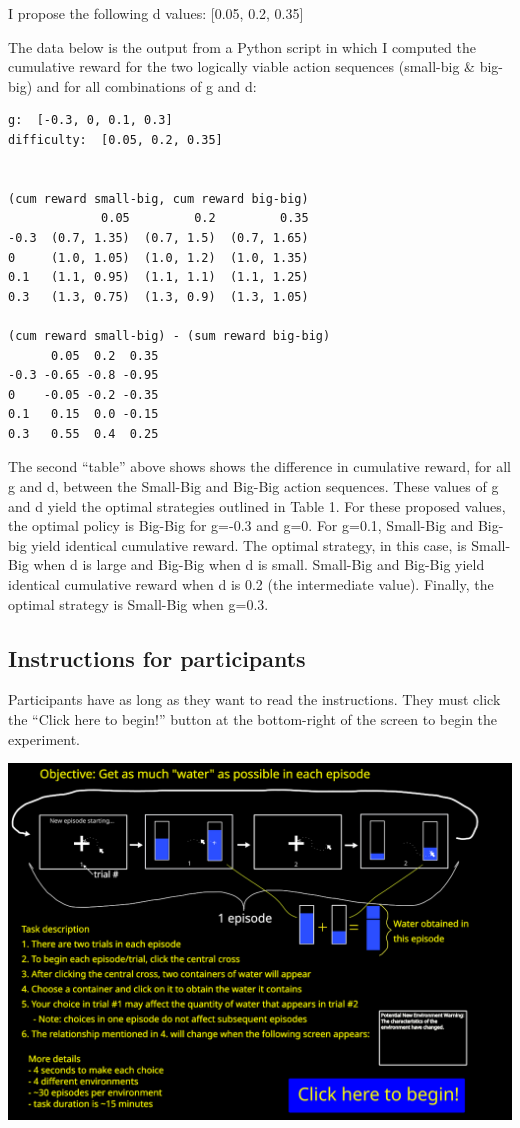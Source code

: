 \documentclass[11pt]{article}
\begin{document}
I propose the following d values: [0.05, 0.2, 0.35]

The data below is the output from a Python script in which I computed the cumulative reward for the two logically viable action sequences (small-big \& big-big) and for all combinations of g and d:

\label{}
\begin{verbatim}
g:  [-0.3, 0, 0.1, 0.3]
difficulty:  [0.05, 0.2, 0.35]


(cum reward small-big, cum reward big-big)
             0.05         0.2         0.35
-0.3  (0.7, 1.35)  (0.7, 1.5)  (0.7, 1.65)
0     (1.0, 1.05)  (1.0, 1.2)  (1.0, 1.35)
0.1   (1.1, 0.95)  (1.1, 1.1)  (1.1, 1.25)
0.3   (1.3, 0.75)  (1.3, 0.9)  (1.3, 1.05) 

(cum reward small-big) - (sum reward big-big)
      0.05  0.2  0.35
-0.3 -0.65 -0.8 -0.95
0    -0.05 -0.2 -0.35
0.1   0.15  0.0 -0.15
0.3   0.55  0.4  0.25
\end{verbatim}

The second ``table'' above shows shows the difference in cumulative reward, for all g and d, between the Small-Big and Big-Big action sequences. These values of g and d yield the optimal strategies outlined in Table 1. For these proposed values, the optimal policy is Big-Big for g=-0.3 and g=0. For g=0.1, Small-Big and Big-big yield identical cumulative reward.  The optimal strategy, in this case, is Small-Big when d is large and Big-Big when d is small. Small-Big and Big-Big yield identical cumulative reward when d is 0.2 (the intermediate value). Finally, the optimal strategy is Small-Big when g=0.3.
\subsection{Instructions for participants}
\label{sec:org23bc4b6}
Participants have as long as they want to read the instructions. They must click the ``Click here to begin!'' button at the bottom-right of the screen to begin the experiment.
\begin{center}
\includegraphics[width=.9\linewidth]{./img/instructions.png}
\end{center}
\end{document}
